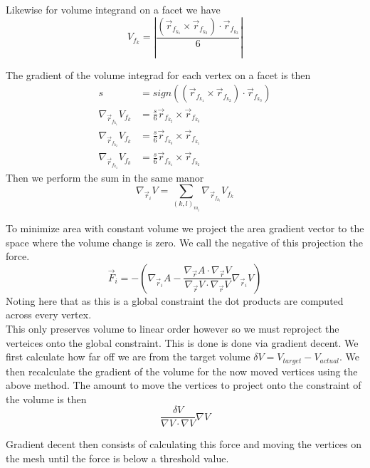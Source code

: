 \documentclass[]{article}
\begin{document}
Likewise for volume integrand on a facet we have
$$V_{f_{k}} = \left|\frac{(\vec{r}_{f_{k_1}} \times \vec{r}_{f_{k_2}}) \cdot \vec{r}_{f_{k_3}}}{6}\right|$$

The gradient of the volume integrad for each vertex on a facet is then
\begin{align}
s &= sign((\vec{r}_{f_{k_1}} \times \vec{r}_{f_{k_2}}) \cdot \vec{r}_{f_{k_3}})\\
\nabla_{\vec{r}_{f_{k_1}}}V_{f_k} &=\frac{s}{6}\vec{r}_{f_{k_2}} \times \vec{r}_{f_{k_3}}\\
\nabla_{\vec{r}_{f_{k_2}}}V_{f_k} &=\frac{s}{6}\vec{r}_{f_{k_3}} \times \vec{r}_{f_{k_1}}\\
\nabla_{\vec{r}_{f_{k_3}}}V_{f_k} &=\frac{s}{6}\vec{r}_{f_{k_1}} \times \vec{r}_{f_{k_2}}
\end{align}
Then we perform the sum in the same manor 
$$\nabla_{\vec{r}_i} V = \sum_{(k,l)_{m_i}} \nabla_{\vec{r}_{f_{k_l}}}V_{f_k}$$

To minimize area with constant volume we project the area gradient vector to the space where the volume change is zero. We call the negative of this projection the force. 
$$ \vec{F}_i = -\left(\nabla_{\vec{r}_i} A - \frac{\nabla_{\vec{r}} A \cdot \nabla_{\vec{r}} V}{\nabla_{\vec{r}} V \cdot \nabla_{\vec{r}} V}\nabla_{\vec{r}_i} V\right)$$
Noting here that as this is a global constraint the dot products are computed across every vertex.\\

This only preserves volume to linear order however so we must reproject the verteices onto the global constraint. This is done is done via gradient decent. We first calculate how far off we are from the target volume $\delta V = V_{target}-V_{actual}$. We then recalculate the gradient of the volume for the now moved vertices using the above method. The amount to move the vertices to project onto the constraint of the volume is then
$$\frac{\delta V}{\nabla V \cdot \nabla V} \nabla V$$


Gradient decent then consists of calculating this force and moving the vertices on the mesh until the force is below a threshold value. 
\end{document}
